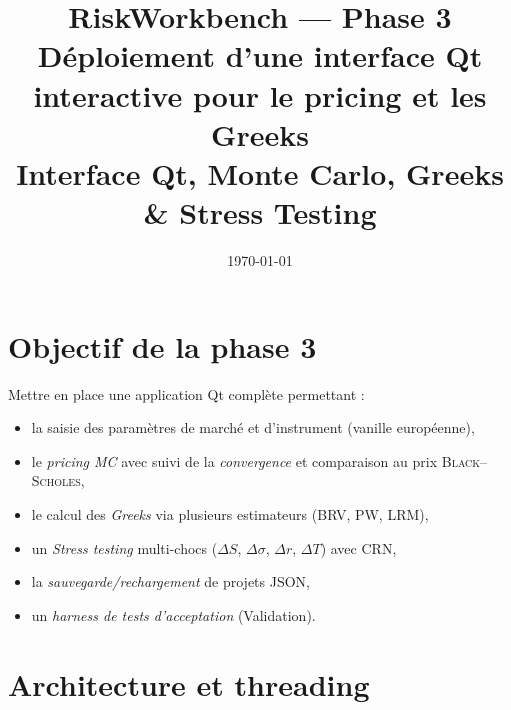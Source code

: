 \documentclass[11pt,a4paper]{article}
\title{RiskWorkbench --- Phase 3 \\ Déploiement d’une interface Qt interactive pour le pricing et les Greeks \\ \large Interface Qt, Monte Carlo, Greeks \& Stress Testing}
\author{ }
\date{\today}
\newcommand{\bs}{\textsc{Black--Scholes}}
\newcommand{\mc}{\textsc{MC}}
\begin{document}
\maketitle
\tableofcontents
\newpage

\section{Objectif de la phase 3}
Mettre en place une application Qt complète permettant :
\begin{itemize}[leftmargin=*]
  \item la saisie des paramètres de marché et d'instrument (vanille européenne),
  \item le \emph{pricing \mc} avec suivi de la \emph{convergence} et comparaison au prix \bs,
  \item le calcul des \emph{Greeks} via plusieurs estimateurs (BRV, PW, LRM),
  \item un \emph{Stress testing} multi-chocs (\(\Delta S\), \(\Delta\sigma\), \(\Delta r\), \(\Delta T\)) avec CRN,
  \item la \emph{sauvegarde/rechargement} de projets JSON,
  \item un \emph{harness de tests d'acceptation} (Validation).
\end{itemize}

\section{Architecture et threading}
\end{document}
